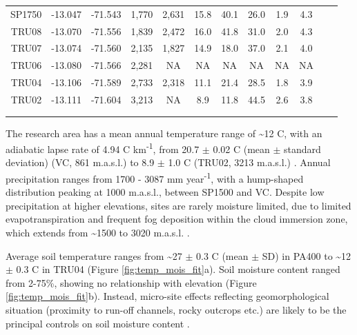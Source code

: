 \documentclass[a4paper,10pt,]{report}
\begin{document}
\begin{table}[H]
\begin{minipage}{\textwidth}
\begin{adjustwidth}{-0.5cm}{-0.5cm}
\begin{center}
\begin{tabular}{@{\extracolsep{0pt}} rSSrcS[table-number-alignment=center, separate-uncertainty=true, table-figures-uncertainty=1, table-figures-decimal=1,table-figures-integer=1]cccccc}
SP1750 &-13.047 & -71.543 & 1,770& 2,631 & 15.8  & 40.1 & 26.0 & 1.9 & 4.3 \\ 
TRU08 & -13.070 & -71.556 & 1,839& 2,472 & 16.0  & 41.8 & 31.0 & 2.0 & 4.3 \\ 
TRU07 & -13.074 & -71.560 & 2,135& 1,827 & 14.9  & 18.0 & 37.0 & 2.1 & 4.0 \\ 
TRU06 &-13.080 & -71.566 & 2,281& NA & NA & NA & NA & NA & NA \\ 
TRU04  & -13.106 & -71.589 & 2,733&2,318 & 11.1  & 21.4 & 28.5 & 1.8 & 3.9 \\ 
TRU02  &  -13.111 & -71.604 & 3,213&NA & 8.9  & 11.8 & 44.5 & 2.6 & 3.8 \\ 
\hline \\[-1.8ex] 
\hline\\
\end{tabular} 
\centering
\end{center}
\end{adjustwidth}
\end{minipage}
\centering
\end{table}

The research area has a mean annual temperature range of \textasciitilde 12 \textdegree C, with an adiabatic lapse rate of 4.94 \textdegree C km\textsuperscript{-1},  from 20.7 $\pm$ 0.02 \textdegree C (mean $\pm$ standard deviation) (VC, 861 m.a.s.l.) to 8.9 $\pm$ 1.0 \textdegree C (TRU02, 3213 m.a.s.l.) \citep{Whitaker2014}. Annual precipitation ranges from 1700 - 3087 mm year\textsuperscript{-1}, with a hump-shaped distribution peaking at 1000 m.a.s.l., between SP1500 and VC. Despite low precipitation at higher elevations, sites are rarely moisture limited, due to limited evapotranspiration and frequent fog deposition within the cloud immersion zone, which extends from \textasciitilde 1500 to 3020 m.a.s.l. \citep{Weg2010}. 

Average soil temperature ranges from \textasciitilde27 $\pm$ 0.3 \textdegree C (mean $\pm$ SD) in PA400 to \textasciitilde 12 $\pm$ 0.3 \textdegree C in TRU04 (Figure \ref{fig:temp_mois_fit}a). Soil moisture content ranged from 2-75\%, showing no relationship with elevation (Figure \ref{fig:temp_mois_fit}b). Instead, micro-site effects reflecting geomorphological situation (proximity to run-off channels, rocky outcrops etc.) are likely to be the principal controls on soil moisture content \citep{Moser2008, Girardin2010}.  
\end{document}
